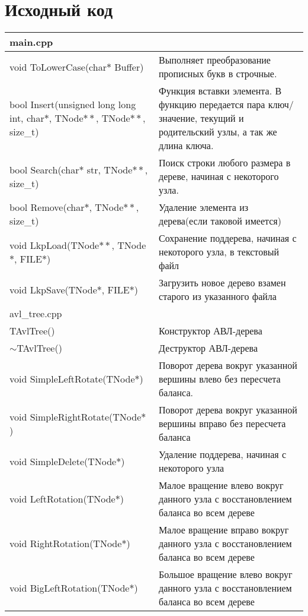 \section{Исходный код}
\begin{longtable}{|p{7.5cm}|p{7.5cm}|}
\hline
\rowcolor{lightgray}
\multicolumn{2}{|c|} {main.cpp}\\
\hline
void ToLowerCase(char$*$ Buffer)&Выполняет преобразование прописных букв в строчные.\\
\hline
bool Insert(unsigned long long int, char$\ast$, TNode$\ast\ast$, TNode$\ast\ast$, size\_t)&Функция вставки элемента. В функцию передается пара ключ/значение, текущий и родительский узлы, а так же длина ключа.\\
\hline
bool Search(char$\ast$ str, TNode$\ast\ast$, size\_t)&Поиск строки любого размера в дереве, начиная с некоторого узла.\\
\hline
bool Remove(char$\ast$, TNode$\ast\ast$, size\_t)&Удаление элемента из дерева(если таковой имеется)\\
\hline
void LkpLoad(TNode$\ast\ast$, TNode$\ast$, FILE$\ast$)&Сохранение поддерева, начиная с некоторого узла, в текстовый файл\\
\hline
void LkpSave(TNode$\ast$, FILE$\ast$)&Загрузить новое дерево взамен старого из указанного файла\\
\hline
\hline
\rowcolor{lightgray}
\multicolumn{2}{|c|} {avl\_tree.cpp}\\
\hline
TAvlTree()&Конструктор АВЛ-дерева\\
\hline
$\sim$TAvlTree()&Деструктор АВЛ-дерева\\
\hline
void SimpleLeftRotate(TNode$\ast$)&Поворот дерева вокруг указанной вершины влево без пересчета баланса. \\
\hline
void SimpleRightRotate(TNode$\ast$)&Поворот дерева вокруг указанной вершины вправо без пересчета баланса\\
\hline
void SimpleDelete(TNode$\ast$)&Удаление поддерева, начиная с некоторого узла\\
\hline
void LeftRotation(TNode$\ast$)&Малое вращение влево вокруг данного узла с восстановлением баланса во всем дереве \\
\hline 
void RightRotation(TNode$\ast$)&Малое вращение вправо вокруг данного узла с восстановлением баланса во всем дереве \\
\hline
void BigLeftRotation(TNode$\ast$)&Большое вращение влево вокруг данного узла с восстановлением баланса во всем дереве	\\

\end{longtable}
